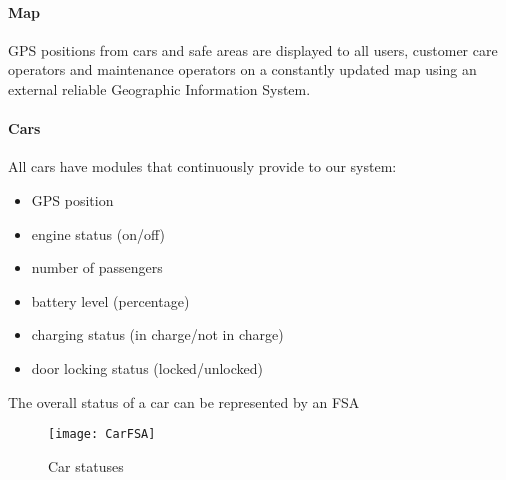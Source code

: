 	\paragraph{Map} GPS positions from cars and safe areas are displayed to all users, customer care operators and maintenance operators on a constantly updated map using an external reliable Geographic Information System.

	\paragraph{Cars}All cars have modules that continuously provide to our system:
	\begin{itemize}
		\item GPS position
		\item engine status (on/off)
		\item number of passengers
		\item battery level (percentage)
		\item charging status (in charge/not in charge)
		\item door locking status (locked/unlocked)
	\end{itemize}	
	The overall status of a car can be represented by an FSA
	\begin{figure}[h]
			\centering
			\texttt{[image: CarFSA]}
			\caption{
				\label{fig:carFSA} 
				Car statuses
			}
		\end{figure}
		
